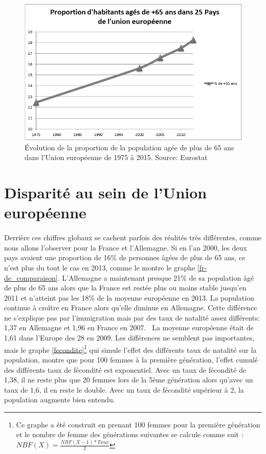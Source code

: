 \begin{figure}[h!]
    \begin{center}
        \includegraphics[scale=0.7]{document/pop_65.png}
        \caption{Évolution de la proportion de la population agée de plus de 65 ans dans l'Union européenne de 1975 à 2015. Source: Eurostat~\citep{eurostat_pop}}
        \label{pop_65}
    \end{center}
\end{figure}


\section{Disparité au sein de l'Union européenne}
\paragraph{}Derrière ces chiffres globaux se cachent parfois des réalités très différentes, comme nous allons l’observer pour la France et l’Allemagne. Si en l'an 2000, les deux pays avaient une proportion de 16\% de personnes âgées de plus de 65 ans, ce n’est plus du tout le cas en 2013, comme le montre le graphe \ref{fr-de_comparaison}. L’Allemagne a maintenant presque 21\% de sa population âgé de plus de 65 ans alors que la France est restée plus ou moins stable jusqu’en 2011 et n’atteint pas les 18\% de la moyenne européenne en 2013. La population continue à croître en France alors qu’elle diminue en Allemagne. Cette différence ne s’explique pas par l’immigration mais par des taux de natalité assez différents: 1,37 en Allemagne et 1,96 en France en 2007.~\citep[pp.5]{frde} La moyenne européenne était de 1,61 dans l’Europe des 28 en 2009. Les différences ne semblent pas importantes, mais le graphe \ref{fecondite}\footnote{Ce graphe a été construit en prenant 100 femmes pour la première génération et le nombre de femme des générations suivantes se calcule comme suit : $ NBF(X) = \frac{NBF(X-1) * Taux}{2}$} qui simule l’effet des différents taux de natalité sur la population, montre que pour 100 femmes à la première génération, l’effet cumulé des différents taux de fécondité est exponentiel. Avec un taux de fécondité de 1,38, il ne reste plus que 20 femmes lors de la 5ème génération alors qu’avec un taux de 1,6, il en reste le double. Avec un taux de fécondité supérieur à 2, la population augmente bien entendu.  
 
